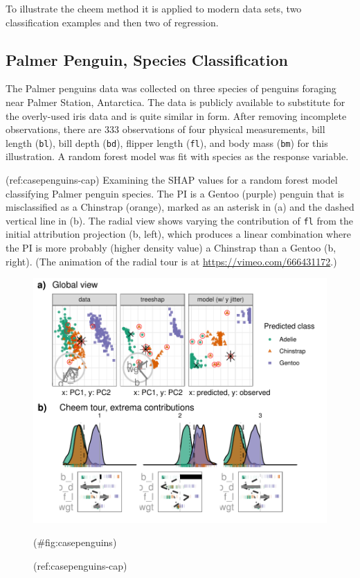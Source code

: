 \documentclass[
]{jss}
\begin{document}
To illustrate the cheem method it is applied to modern data sets, two classification examples and then two of regression.

\hypertarget{palmer-penguin-species-classification}{%
\subsection{Palmer Penguin, Species Classification}\label{palmer-penguin-species-classification}}

The Palmer penguins data \citep{gorman_ecological_2014, horst_palmerpenguins_2020} was collected on three species of penguins foraging near Palmer Station, Antarctica. The data is publicly available to substitute for the overly-used iris data and is quite similar in form. After removing incomplete observations, there are 333 observations of four physical measurements, bill length (\texttt{bl}), bill depth (\texttt{bd}), flipper length (\texttt{fl}), and body mass (\texttt{bm}) for this illustration. A random forest model was fit with species as the response variable.

(ref:casepenguins-cap) Examining the SHAP values for a random forest model classifying Palmer penguin species. The PI is a Gentoo (purple) penguin that is misclassified as a Chinstrap (orange), marked as an asterisk in (a) and the dashed vertical line in (b). The radial view shows varying the contribution of \texttt{fl} from the initial attribution projection (b, left), which produces a linear combination where the PI is more probably (higher density value) a Chinstrap than a Gentoo (b, right). (The animation of the radial tour is at \url{https://vimeo.com/666431172}.)

\begin{CodeChunk}
\begin{figure}

{\centering \includegraphics[width=1\linewidth]{./figures/case_penguins} 

}

\caption[(ref:casepenguins-cap)]{(ref:casepenguins-cap)}(\#fig:casepenguins)
\end{figure}
\end{CodeChunk}
\end{document}
